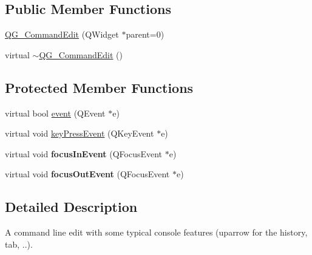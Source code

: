 \subsection*{Public Member Functions}
\begin{DoxyCompactItemize}
\item 
\hyperlink{classQG__CommandEdit_a94a6a627062e5e74a4daf3e1d7f4c99d}{Q\-G\-\_\-\-Command\-Edit} (Q\-Widget $\ast$parent=0)
\item 
virtual \hyperlink{classQG__CommandEdit_a3f71053eaa4d45b930ae911440717edb}{$\sim$\-Q\-G\-\_\-\-Command\-Edit} ()
\end{DoxyCompactItemize}
\subsection*{Protected Member Functions}
\begin{DoxyCompactItemize}
\item 
virtual bool \hyperlink{classQG__CommandEdit_ad2407dee3f143dbaea18b6474476459b}{event} (Q\-Event $\ast$e)
\item 
virtual void \hyperlink{classQG__CommandEdit_abdc01474b1573f1e1868cc0c27428ac3}{key\-Press\-Event} (Q\-Key\-Event $\ast$e)
\item 
\hypertarget{classQG__CommandEdit_a2c237dc1dc27bfdd7665767fc7cb32d9}{virtual void {\bfseries focus\-In\-Event} (Q\-Focus\-Event $\ast$e)}\label{classQG__CommandEdit_a2c237dc1dc27bfdd7665767fc7cb32d9}

\item 
\hypertarget{classQG__CommandEdit_a423d018df5d4c77ebc1fd435f3f3f357}{virtual void {\bfseries focus\-Out\-Event} (Q\-Focus\-Event $\ast$e)}\label{classQG__CommandEdit_a423d018df5d4c77ebc1fd435f3f3f357}

\end{DoxyCompactItemize}


\subsection{Detailed Description}
A command line edit with some typical console features (uparrow for the history, tab, ..). 

